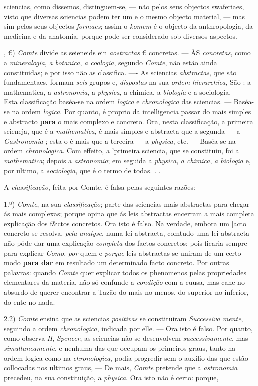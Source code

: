 sciencias, como dissemos, distinguem-se, --- não pelos seus objectos swaferiaes, visto que diversas sciencias podem ter um e o mesmo objecto material, --- mas sim pelos seus objectos \emph{formaes}; assim o \emph{komem} é o objecto da anthropologia, da medicina e da anatomia, porque pode ser considerado sob diversos aspectos.\par , €) \emph{Comte} divide as seieneids ein \emph{aostractas} € concretas. --- ÀS \emph{concretas}, como a \emph{mineralogia}, \emph{a botanica}, \emph{a coologia}, segundo \emph{Comte}, não estão ainda constituidas; e por isso não as classifica. ---- As sciencias \emph{abstractas}, que são fundamentaes, formam \emph{seis} grupos e, \emph{dispostas} na sua \emph{ordem hierarchica}, São : a mathematica, a \emph{astronomia}, a \emph{physica}, a chimica, a \emph{biologia} e a sociologia. --- Esta classificação baséa-se na ordem \emph{logica} e \emph{chronologica} das sciencias. --- Baséa-se na ordem \emph{logica}. Por quanto, é proprio da intelligencia passar do mais simples e abstracto \textbf{para} o mais complexo e concreto. Ora, nesta classificação, a primeira scieneja, que é a \emph{mathematica}, é mais simples e abstracta que a segunda --- a \emph{Gastronomia} ; esta o é mais que a terceira --- a \emph{physica}, etc. --- Baséa-se na ordem \emph{chronologica}. Com effeito, a 'primeira sciencia, que se constituiu, foi a \emph{mathematica}; depois a \emph{astronomia}; em seguida a \emph{physica}, \emph{a chimica}, \emph{a biologia} e, por ultimo, a \emph{sociologia}, que é o termo de todas. . .\par A \emph{classificação}, feita por Comte, é falsa pelas seguintes razões:\par 1.º) \emph{Comte}, na sua \emph{classificação}; parte das sciencias mais abstractas para chegar ás mais complexas; porque opina que ás leis abstractas encerram a mais completa explicação dos f\&ctos concretos. Ora isto é falso. Na verdade, embora um [acto concreto se resolva, \emph{pela analyse}, numa lei abstracta, comtudo uma lei abstracta não póde dar uma explicação \emph{completa} dos factos concretos; pois ficaria sempre para explicar \emph{Como}, \emph{por} quem e \emph{porque} leis abstractas se uniram de um certo modo \textbf{para dar} em resultado um determinado facto concreto. Por outras palavras: quando \emph{Comte} quer explicar todos os phenomenos pelas propriedades elementares da materia, não só confunde a \emph{condição} com a cuusa, mas cahe no absurdo de querer encontrar a Tazão do mais no menos, do superior no inferior, do ente no nada.\par 2.2) \emph{Comte} ensina que as sciencias \emph{positivas} se constituiram \emph{Successiva mente}, seguindo a ordem \emph{chronologica}, indicada por elle. --- Ora isto é falso. Por quanto, como observa \emph{H}, \emph{Spencer}, as sciencias não se desenvolvem \emph{successivamente}, mas \emph{simultaneamente}, e nenhuma das que oecupam os primeiros graus, tanto na ordem logica como na \emph{chronologica}, podia progredir sem o auxilio das que estão collocadas nos ultimos graus, --- De mais, \emph{Comte} pretende que a \emph{astronomia} precedeu, na sua constituição, a \emph{physica}. Ora isto não é certo: porque, 